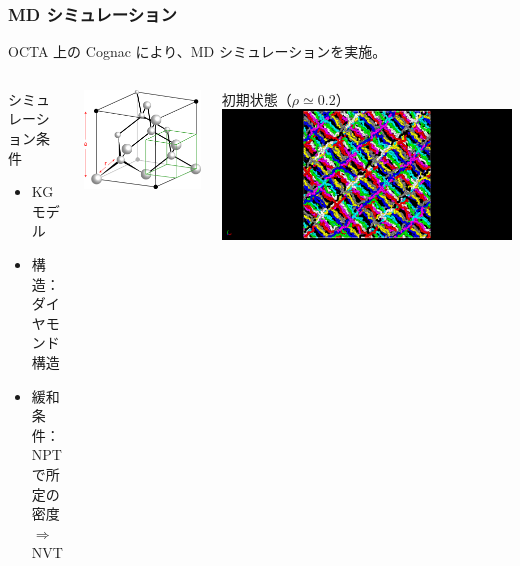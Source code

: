 \documentclass[11pt, dvipdfmx]{beamer}
\begin{document}
\begin{frame}
\frametitle{MD シミュレーション}

OCTA 上の Cognac により、MD シミュレーションを実施。

\begin{columns}[T, totalwidth=1\linewidth]
\begin{block}{\large シミュレーション条件}
	\begin{itemize}
	\item
	KG モデル
	\item
	構造：ダイヤモンド構造
	
	\item
	緩和条件：\\
	NPTで所定の密度 $\Rightarrow$ NVT
	\end{itemize} 
\end{block}
\vspace{5mm}

\centering
\includegraphics[width=0.6\columnwidth]{./fig/dia_green_2.png}

初期状態（$\rho \simeq 0.2$）
\includegraphics[width=\columnwidth]{./fig/Init.png}


\end{columns}
\end{frame}
\end{document}
